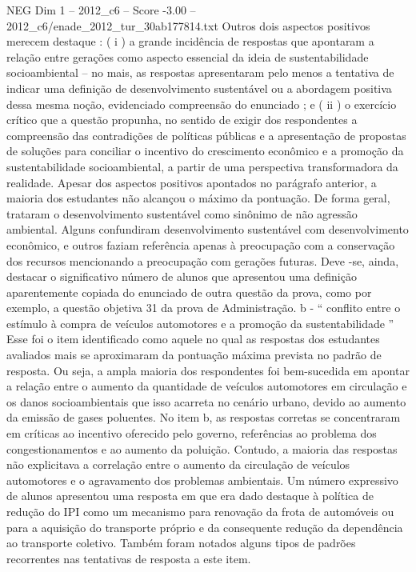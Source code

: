 \begin{textsample}{NEG Dim 1 – 2012\_c6 – Score -3.00 – 2012\_c6/enade\_2012\_tur\_30ab177814.txt}
Outros dois aspectos positivos merecem destaque : ( i ) a grande incidência de respostas que apontaram a relação entre gerações como aspecto essencial da ideia de sustentabilidade socioambiental – no mais, as respostas apresentaram pelo menos a tentativa de indicar uma definição de desenvolvimento sustentável ou a abordagem positiva dessa mesma noção, evidenciado compreensão do enunciado ; e ( ii ) o exercício crítico que a questão propunha, no sentido de exigir dos respondentes a compreensão das contradições de políticas públicas e a apresentação de propostas de soluções para conciliar o incentivo do crescimento econômico e a promoção da sustentabilidade socioambiental, a partir de uma perspectiva transformadora da realidade.
Apesar dos aspectos positivos apontados no parágrafo anterior, a maioria dos estudantes não alcançou o máximo da pontuação.
De forma geral, trataram o desenvolvimento sustentável como sinônimo de não agressão ambiental.
Alguns confundiram desenvolvimento sustentável com desenvolvimento econômico, e outros faziam referência apenas à preocupação com a conservação dos recursos mencionando a preocupação com gerações futuras.
Deve -se, ainda, destacar o significativo número de alunos que apresentou uma definição aparentemente copiada do enunciado de outra questão da prova, como por exemplo, a questão objetiva 31 da prova de Administração. b - “ conflito entre o estímulo à compra de veículos automotores e a promoção da sustentabilidade ” Esse foi o item identificado como aquele no qual as respostas dos estudantes avaliados mais se aproximaram da pontuação máxima prevista no padrão de resposta.
Ou seja, a ampla maioria dos respondentes foi bem-sucedida em apontar a relação entre o aumento da quantidade de veículos automotores em circulação e os danos socioambientais que isso acarreta no cenário urbano, devido ao aumento da emissão de gases poluentes.
No item b, as respostas corretas se concentraram em críticas ao incentivo oferecido pelo governo, referências ao problema dos congestionamentos e ao aumento da poluição.
Contudo, a maioria das respostas não explicitava a correlação entre o aumento da circulação de veículos automotores e o agravamento dos problemas ambientais.
Um número expressivo de alunos apresentou uma resposta em que era dado destaque à política de redução do IPI como um mecanismo para renovação da frota de automóveis ou para a aquisição do transporte próprio e da consequente redução da dependência ao transporte coletivo.
Também foram notados alguns tipos de padrões recorrentes nas tentativas de resposta a este item.

\end{textsample}
